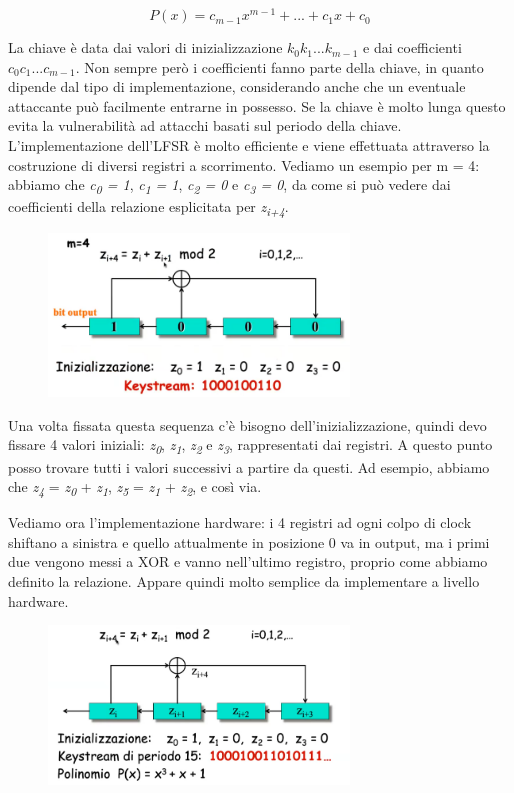 \[P(x) = c_{m-1}x^{m-1} + ... + c_{1}x  + c_{0}\]

La chiave è data dai valori di inizializzazione $k_{0} k_{1} ... k_{m-1}$ e dai coefficienti $c_{0} c_{1} ... c_{m-1}$. Non sempre però i coefficienti fanno parte della chiave, in quanto dipende dal tipo di implementazione, considerando anche che un eventuale attaccante può facilmente entrarne in possesso. Se la chiave è molto lunga questo evita la vulnerabilità ad attacchi basati sul periodo della chiave. L'implementazione dell'LFSR è molto efficiente e viene effettuata attraverso la costruzione di diversi registri a scorrimento. Vediamo un esempio per m = 4: abbiamo che \textit{c\textsubscript{0} = 1}, \textit{c\textsubscript{1} = 1}, \textit{c\textsubscript{2} = 0} e \textit{c\textsubscript{3} = 0}, da come si può vedere dai coefficienti della relazione esplicitata per \textit{z\textsubscript{i+4}}.

\begin{figure}[htb!]
    \centering
    \includegraphics[width=8cm]{./Images/cap1/1.31.png}
\end{figure} 

Una volta fissata questa sequenza c'è bisogno dell'inizializzazione, quindi devo fissare 4 valori iniziali: \textit{z\textsubscript{0}}, \textit{z\textsubscript{1}}, \textit{z\textsubscript{2}} e \textit{z\textsubscript{3}}, rappresentati dai registri. A questo punto posso trovare tutti i valori successivi a partire da questi. Ad esempio, abbiamo che \textit{z\textsubscript{4}} = \textit{z\textsubscript{0}} + \textit{z\textsubscript{1}}, \textit{z\textsubscript{5}} = \textit{z\textsubscript{1}} + \textit{z\textsubscript{2}}, e così via. 

Vediamo ora l'implementazione hardware: i 4 registri ad ogni colpo di clock shiftano a sinistra e quello attualmente in posizione 0 va in output, ma i primi due vengono messi a XOR e vanno nell'ultimo registro, proprio come abbiamo definito la relazione. Appare quindi molto semplice da implementare a livello hardware.

\begin{figure}[htb!]
    \centering
    \includegraphics[width=8cm]{./Images/cap1/1.32.png}
\end{figure} 

